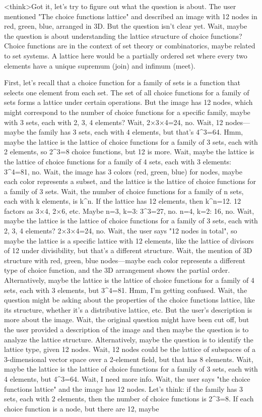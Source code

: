 <think>Got it, let's try to figure out what the question is about. The user mentioned "The choice functions lattice" and described an image with 12 nodes in red, green, blue, arranged in 3D. But the question isn't clear yet. Wait, maybe the question is about understanding the lattice structure of choice functions? Choice functions are in the context of set theory or combinatorics, maybe related to set systems. A lattice here would be a partially ordered set where every two elements have a unique supremum (join) and infimum (meet). 

First, let's recall that a choice function for a family of sets is a function that selects one element from each set. The set of all choice functions for a family of sets forms a lattice under certain operations. But the image has 12 nodes, which might correspond to the number of choice functions for a specific family, maybe with 3 sets, each with 2, 3, 4 elements? Wait, 2×3×4=24, no. Wait, 12 nodes—maybe the family has 3 sets, each with 4 elements, but that's 4^3=64. Hmm, maybe the lattice is the lattice of choice functions for a family of 3 sets, each with 2 elements, so 2^3=8 choice functions, but 12 is more. Wait, maybe the lattice is the lattice of choice functions for a family of 4 sets, each with 3 elements: 3^4=81, no. Wait, the image has 3 colors (red, green, blue) for nodes, maybe each color represents a subset, and the lattice is the lattice of choice functions for a family of 3 sets. Wait, the number of choice functions for a family of n sets, each with k elements, is k^n. If the lattice has 12 elements, then k^n=12. 12 factors as 3×4, 2×6, etc. Maybe n=3, k=3: 3^3=27, no. n=4, k=2: 16, no. Wait, maybe the lattice is the lattice of choice functions for a family of 3 sets, each with 2, 3, 4 elements? 2×3×4=24, no. Wait, the user says "12 nodes in total", so maybe the lattice is a specific lattice with 12 elements, like the lattice of divisors of 12 under divisibility, but that's a different structure. Wait, the mention of 3D structure with red, green, blue nodes—maybe each color represents a different type of choice function, and the 3D arrangement shows the partial order. Alternatively, maybe the lattice is the lattice of choice functions for a family of 4 sets, each with 3 elements, but 3^4=81. Hmm, I'm getting confused. Wait, the question might be asking about the properties of the choice functions lattice, like its structure, whether it's a distributive lattice, etc. But the user's description is more about the image. Wait, the original question might have been cut off, but the user provided a description of the image and then maybe the question is to analyze the lattice structure. Alternatively, maybe the question is to identify the lattice type, given 12 nodes. Wait, 12 nodes could be the lattice of subspaces of a 3-dimensional vector space over a 2-element field, but that has 8 elements. Wait, maybe the lattice is the lattice of choice functions for a family of 3 sets, each with 4 elements, but 4^3=64. Wait, I need more info. Wait, the user says "the choice functions lattice" and the image has 12 nodes. Let's think: if the family has 3 sets, each with 2 elements, then the number of choice functions is 2^3=8. If each choice function is a node, but there are 12, maybe 